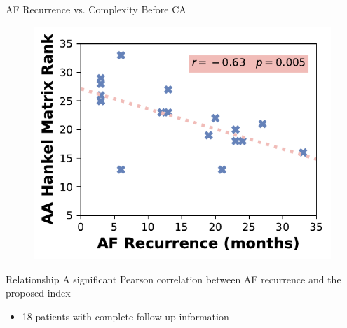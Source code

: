 \documentclass{beamer}
\begin{document}
	\begin{frame}{AF Recurrence vs. Complexity Before CA} 
		
		\vspace{-0.3cm}
		\begin{figure}[h]
			\centering
			\includegraphics[scale=0.7]{figures/rank_LR.pdf}
		\end{figure}
		\vspace{-0.5cm}
		\begin{block}{Relationship}
			A significant Pearson correlation between AF recurrence and the proposed index
			\begin{itemize}
				\item 18 patients with complete follow-up information
			\end{itemize}
		\end{block}	
	\end{frame}
\end{document}
